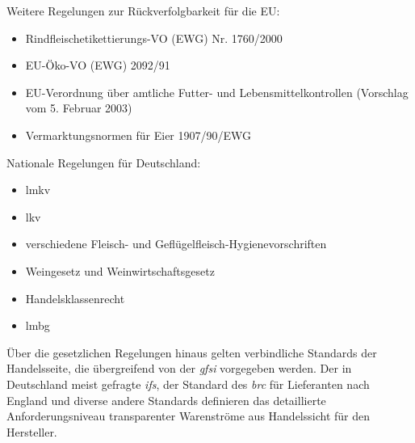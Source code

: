 \noindent
Weitere Regelungen zur Rückverfolgbarkeit für die EU:
\begin{itemize}
  \item Rindfleischetikettierungs-VO (EWG) Nr. 1760/2000
  \item EU-Öko-VO (EWG) 2092/91
  \item EU-Verordnung über amtliche Futter- und Lebensmittelkontrollen (Vorschlag vom 5. Februar 2003)
  \item Vermarktungsnormen für Eier 1907/90/EWG
\end{itemize}
Nationale Regelungen für Deutschland:
\begin{itemize}
  \item \acf{lmkv}
  \item \acf{lkv}
  \item verschiedene Fleisch- und Geflügelfleisch-Hygienevorschriften
  \item Weingesetz und Weinwirtschaftsgesetz
  \item Handelsklassenrecht
  \item \acf{lmbg}
\end{itemize}

Über die gesetzlichen Regelungen hinaus gelten verbindliche Standards der Handelsseite, die übergreifend von der \textit{\ac{gfsi}} vorgegeben werden. Der in Deutschland meist gefragte \textit{\ac{ifs}}, der Standard des \textit{\ac{brc}} für Lieferanten nach England und diverse andere Standards definieren das detaillierte Anforderungsniveau transparenter Warenströme aus Handelssicht für den Hersteller.

